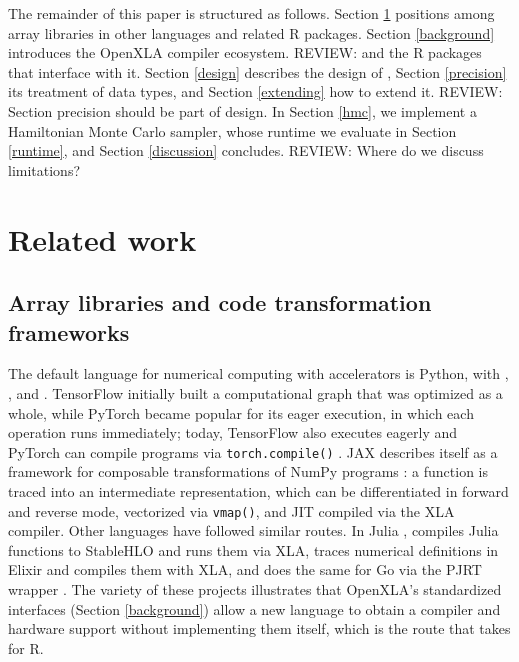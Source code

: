 The remainder of this paper is structured as follows.
Section \ref{related-work} positions  among array libraries in other languages and related R packages.
Section \ref{background} introduces the OpenXLA compiler ecosystem. REVIEW: and the R packages that interface with it.
Section \ref{design} describes the design of , Section \ref{precision} its treatment of data types, and Section \ref{extending} how to extend it.
REVIEW: Section precision should be part of design.
In Section \ref{hmc}, we implement a Hamiltonian Monte Carlo sampler, whose runtime we evaluate in Section \ref{runtime}, and Section \ref{discussion} concludes.
REVIEW: Where do we discuss limitations?

\section{Related work}\label{related-work}

\subsection{Array libraries and code transformation frameworks}\label{libraries}

The default language for numerical computing with accelerators is Python, with  \citep{ref-abadi2016tensorflow},  \citep{ref-pytorch}, and  \citep{ref-jax}.
TensorFlow initially built a computational graph that was optimized as a whole, while PyTorch became popular for its eager execution, in which each operation runs immediately; today, TensorFlow also executes eagerly and PyTorch can compile programs via \texttt{torch.compile()} \citep{ref-ansel2024pytorch}.
JAX describes itself as a framework for composable transformations of NumPy programs \citep{ref-harris2020array}: a function is traced into an intermediate representation, which can be differentiated in forward and reverse mode, vectorized via \texttt{vmap()}, and JIT compiled via the XLA compiler.
Other languages have followed similar routes.
In Julia \citep{ref-bezanson2017julia},  \citep{ref-reactant} compiles Julia functions to StableHLO and runs them via XLA,  \citep{ref-nx} traces numerical definitions in Elixir and compiles them with XLA, and  \citep{ref-gomlx} does the same for Go via the PJRT wrapper  \citep{ref-gopjrt}.
The variety of these projects illustrates that OpenXLA's standardized interfaces (Section \ref{background}) allow a new language to obtain a compiler and hardware support without implementing them itself, which is the route that  takes for R.

